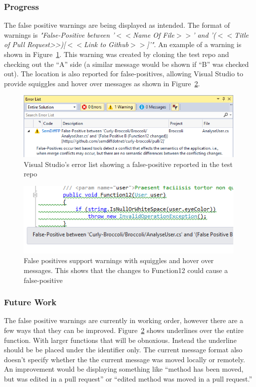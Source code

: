\documentclass[draftclsnofoot,onecolumn]{IEEEtran}
\begin{document}
\subsubsection{Progress}
The false positive warnings are being displayed as intended. The format of 
warnings is \textit{"False-Positive between '$<<$Name Of File$>>$' and 
    '($<<$Title of Pull Request>>)[$<<$Link to Github$>>$]'"}. An example of 
a warning is shown in Figure~\ref{fperrorlist}. This warning was created by 
cloning the test repo and checking out the “A” side (a similar message would 
be shown if “B” was checked out). The location is also reported for 
false-positives, allowing Visual Studio to provide squiggles and hover over 
messages as shown in Figure~\ref{fphoverover}.

\begin{figure}[!t]
\centering
\includegraphics[scale=1]{FalsePositiveErrorList}
\caption{Visual Studio’s error list showing a false-positive reported in the 
test repo}
\label{fperrorlist}
\end{figure}

\begin{figure}[!t]
\centering
\includegraphics[scale=1]{FalsePositiveHoverOver}
\caption{False positives support warnings with squiggles and hover over 
messages. This shows that the changes to Function12 could cause a 
false-positive}
\label{fphoverover}
\end{figure}

\subsubsection{Future Work}

The false positive warnings are currently in working order, however there are a 
few ways that they can be improved. Figure~\ref{fphoverover} shows underlines 
over the entire function. With larger functions that will be obnoxious. Instead 
the underline should be be placed under the identifier only. The current 
message format also doesn’t specify whether the the current message was moved 
locally or remotely. An improvement would be displaying something like “method 
has been moved, but was edited in a pull request” or “edited method was moved 
in a pull request.”
\end{document}
